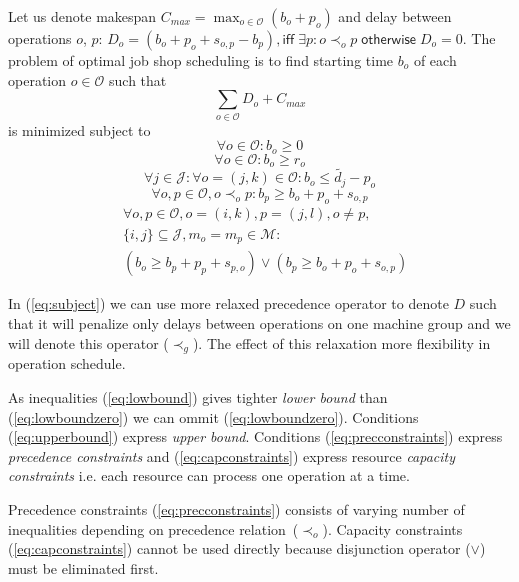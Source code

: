 \documentclass[a4paper,journal,twocolumn]{IEEEtran}
\begin{document}
Let us denote makespan $C_{max} = \max_{o\in\mathcal{O}}\left(b_o + p_o\right)$ and 
delay between operations $o$, $p$:  $D_o = \left(b_o + p_o +s_{o,p}-b_p\right), \mathsf{iff}\; \exists p: o \prec_o p\; \mathsf{otherwise}\;D_o= 0$.
The problem of optimal job shop scheduling is to find starting time $b_o$ of each operation $o\in\mathcal{O}$ such that
\begin{equation}\label{eq:subject}
	 \sum_{o\in\mathcal{O}}D_o + C_{max}
\end{equation}
is minimized subject to
\begin{equation} \label{eq:lowboundzero}
	\forall o\in\mathcal{O}: b_o \ge 0 
\end{equation}
\begin{equation}\label{eq:lowbound}
	\forall o\in\mathcal{O}: b_o \ge r_o
\end{equation}
\begin{equation}\label{eq:upperbound}
	\forall j \in \mathcal{J}: \forall o=(j,k)\in\mathcal{O}: b_o\le \tilde{d_j}-p_o
\end{equation}
\begin{equation}\label{eq:precconstraints}
	\forall o,p \in\mathcal{O}, o\prec_o p:b_p \ge b_o+p_o+s_{o,p}
\end{equation}
\begin{align}\label{eq:capconstraints}
	& \forall o,p\in\mathcal{O},o=(i,k),p=(j,l),o\neq p, \\
	& \{i,j\}\subseteq\mathcal{J}, m_o=m_p\in \mathcal{M}: \nonumber \\
	& (b_o \ge b_p+p_p+s_{p,o}) \vee  (b_p \ge b_o+p_o+s_{o,p})  \nonumber 
\end{align}

In (\ref{eq:subject}) we can use more relaxed precedence operator to denote $D$ such that it will penalize 
only delays between operations on one machine group and we will denote this operator ($\prec_g$). The effect 
of this relaxation more flexibility in operation schedule.

As inequalities (\ref{eq:lowbound}) gives tighter \emph{lower bound} than (\ref{eq:lowboundzero}) we can ommit
(\ref{eq:lowboundzero}).
Conditions (\ref{eq:upperbound}) express \emph{upper bound}. Conditions (\ref{eq:precconstraints}) express
\emph{precedence constraints} and (\ref{eq:capconstraints}) express resource \emph{capacity constraints}
i.e. each resource can process one operation at a time.

Precedence constraints (\ref{eq:precconstraints}) consists of varying number of inequalities depending on 
precedence relation~($\prec_o$). Capacity constraints (\ref{eq:capconstraints}) cannot be used directly 
because disjunction operator ($\vee$) must be eliminated first.
\end{document}
